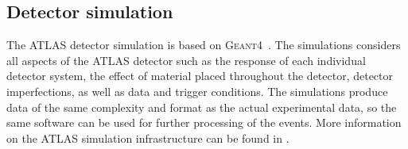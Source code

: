 

\subsection{Detector simulation}
The ATLAS detector simulation is based on \textsc{Geant4}~\cite{Agostinelli:2002hh}.
The simulations considers all aspects of the ATLAS detector such as the response of each individual detector system, the effect of material placed throughout the detector, detector imperfections, as well as data and trigger conditions.
The simulations produce data of the same complexity and format as the actual experimental data, so the same software can be used for further processing of the events.
More information on the ATLAS simulation infrastructure can be found in .

